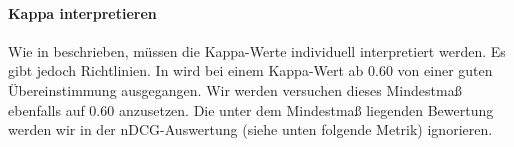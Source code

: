 \begin{table}[H]
\centering
\vspace{-.5em}
\caption[Beispiel Gewichtung in Übereinstimmungsmatrix für $p_{0_{w}}$]{Beispiel Gewichtung in Übereinstimmungsmatrix für $p_{0_{w}}$}
\label{tab:GewichtungKreuztabelleKappaBerechnung}
\vspace{-.5em}
\vspace{-1.5em}
\end{table}

\paragraph{Kappa interpretieren}

Wie in \cite{KappaWerte} beschrieben, müssen die Kappa-Werte individuell interpretiert werden. Es gibt jedoch Richtlinien. In \cite{Kappa} wird bei einem Kappa-Wert ab 0.60 von einer guten Übereinstimmung ausgegangen. Wir werden versuchen dieses Mindestmaß ebenfalls auf 0.60 anzusetzen. Die unter dem Mindestmaß liegenden Bewertung werden wir in der nDCG-Auswertung (siehe unten folgende Metrik) ignorieren. 


